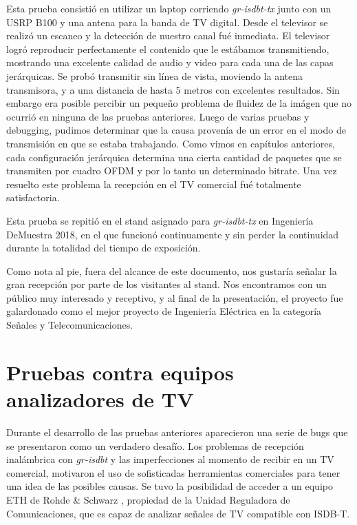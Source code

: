 Esta prueba consistió en utilizar un laptop corriendo \textit{gr-isdbt-tx} junto con un USRP B100 y una antena para la banda de TV digital. Desde el televisor se realizó un escaneo y la detección de nuestro canal fué inmediata. El televisor logró reproducir perfectamente el contenido que le estábamos transmitiendo, mostrando una excelente calidad de audio y video para cada una de las capas jerárquicas. Se probó transmitir sin línea de vista, moviendo la antena transmisora, y a una distancia de hasta 5 metros con excelentes resultados. Sin embargo era posible percibir un pequeño problema de fluidez de la imágen que no ocurrió en ninguna de las pruebas anteriores. Luego de varias pruebas y debugging, pudimos determinar que la causa provenía de un error en el modo de transmisión en que se estaba trabajando. Como vimos en capítulos anteriores, cada configuración jerárquica determina una cierta cantidad de paquetes que se transmiten por cuadro OFDM y por lo tanto un determinado bitrate. Una vez resuelto este problema la recepción en el TV comercial fué totalmente satisfactoria.  

Esta prueba se repitió en el stand asignado para \textit{gr-isdbt-tx} en Ingeniería DeMuestra 2018, en el que funcionó continuamente y sin perder la continuidad durante la totalidad del tiempo de exposición. 

Como nota al pie, fuera del alcance de este documento, nos gustaría señalar la gran recepción por parte de los visitantes al stand. Nos encontramos con un público muy interesado y receptivo, y al final de la presentación, el proyecto fue galardonado como el mejor proyecto de Ingeniería Eléctrica en la categoría Señales y Telecomunicaciones.

\section{Pruebas contra equipos analizadores de TV}

Durante el desarrollo de las pruebas anteriores aparecieron una serie de bugs que se presentaron como un verdadero desafío. Los problemas de recepción inalámbrica con \textit{gr-isdbt} y las imperfecciones al  momento de recibir en un TV comercial, motivaron el uso de sofisticadas herramientas comerciales para tener una idea de las posibles causas. Se tuvo la posibilidad de acceder a un equipo ETH de Rohde \& Schwarz \cite{Rohde}, propiedad de la Unidad Reguladora de Comunicaciones, que es capaz de analizar señales de TV compatible con ISDB-T. 


